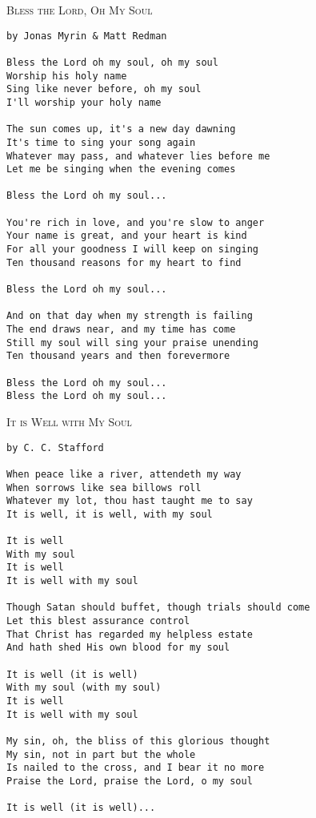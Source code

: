 \documentclass[10pt,oneside,footinclude=true,headinclude=true]{scrbook} %
\newcommand\songtitle[1]{
	\hspace*{-3.7mm}\Large\textsc{#1}
}
\begin{document}

\newpage
\bigskip
\songtitle{Bless the Lord, Oh My Soul}
\begin{verbatim}
by Jonas Myrin & Matt Redman

Bless the Lord oh my soul, oh my soul
Worship his holy name
Sing like never before, oh my soul
I'll worship your holy name

The sun comes up, it's a new day dawning
It's time to sing your song again
Whatever may pass, and whatever lies before me
Let me be singing when the evening comes

Bless the Lord oh my soul...

You're rich in love, and you're slow to anger
Your name is great, and your heart is kind
For all your goodness I will keep on singing
Ten thousand reasons for my heart to find

Bless the Lord oh my soul...

And on that day when my strength is failing
The end draws near, and my time has come
Still my soul will sing your praise unending
Ten thousand years and then forevermore

Bless the Lord oh my soul...
Bless the Lord oh my soul...

\end{verbatim}


\newpage
\bigskip
\songtitle{It is Well with My Soul}
\begin{verbatim}
by C. C. Stafford

When peace like a river, attendeth my way
When sorrows like sea billows roll
Whatever my lot, thou hast taught me to say
It is well, it is well, with my soul

It is well
With my soul
It is well
It is well with my soul

Though Satan should buffet, though trials should come
Let this blest assurance control
That Christ has regarded my helpless estate
And hath shed His own blood for my soul

It is well (it is well)
With my soul (with my soul)
It is well
It is well with my soul

My sin, oh, the bliss of this glorious thought
My sin, not in part but the whole
Is nailed to the cross, and I bear it no more
Praise the Lord, praise the Lord, o my soul

It is well (it is well)...

\end{verbatim}
\end{document}
